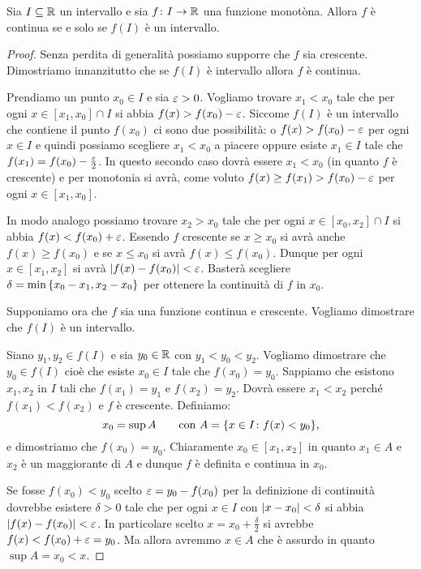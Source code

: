   \begin{theorem}
    \label{th:monotona_continua}%
    \mymark{*}%
    Sia $I\subseteq {\mathbb R}$ un intervallo e sia
    $f\colon I \to {\mathbb R}$ una funzione monotòna.
    Allora $f$ è continua se e solo se $f(I)$ è 
    un intervallo.
  \end{theorem}
  \begin{proof}
  Senza perdita di generalità possiamo supporre che $f$ 
  sia crescente. 
  Dimostriamo innanzitutto che se $f(I)$ è intervallo allora $f$ è continua.
  
  Prendiamo un punto $x_0\in I$ e sia $\varepsilon>0$.
  Vogliamo trovare $x_1<x_0$ tale che  
  per ogni $x\in [x_1,x_0]\cap I$ si abbia $f(x)>f(x_0)-\varepsilon$.
  Siccome $f(I)$ è un intervallo che contiene il punto $f(x_0)$ 
  ci sono due possibilità: o $f(x)>f(x_0)-\varepsilon$ per ogni $x\in I$
  e quindi possiamo scegliere $x_1<x_0$ a piacere
  oppure esiste $x_1\in I$ tale che $f(x_1)=f(x_0) - \frac {\varepsilon} 2$.
  In questo secondo caso dovrà essere $x_1<x_0$ (in quanto $f$ è crescente)
  e per monotonia si avrà, come voluto $f(x)\ge f(x_1) > f(x_0)-\varepsilon$ 
  per ogni $x\in [x_1,x_0]$.
  
  In modo analogo possiamo trovare $x_2>x_0$ tale 
  che per ogni $x\in [x_0,x_2]\cap I$ si abbia $f(x) < f(x_0)+\varepsilon$.
  Essendo $f$ crescente se $x\ge x_0$ si avrà anche $f(x)\ge f(x_0)$ 
  e se $x\le x_0$ si avrà $f(x) \le f(x_0)$. 
  Dunque per ogni $x\in [x_1,x_2]$ si avrà ${\left|f(x)-f(x_0)\right|}<\varepsilon$.
  Basterà scegliere $\delta = \min{\left\{ x_0-x_1,x_2-x_0 \right\}}$ 
  per ottenere la continuità di $f$ in $x_0$.
  
  Supponiamo ora che $f$ sia una funzione continua e crescente.
  Vogliamo dimostrare che $f(I)$ è un intervallo.
  
  Siano $y_1, y_2 \in f(I)$ e sia $y_0\in {\mathbb R}$
  con $y_1 < y_0 < y_2$.
  Vogliamo dimostrare che $y_0\in f(I)$ cioè che esiste $x_0\in I$
  tale che $f(x_0)=y_0$.
  Sappiamo che esistono $x_1,x_2$ in $I$ tali che
  $f(x_1) = y_1$ e $f(x_2) = y_2$.
  Dovrà essere $x_1<x_2$ perché $f(x_1)<f(x_2)$ e
  $f$ è crescente.
  Definiamo:
  \[
   x_0 = \sup A
  \qquad
  \text{con } A={\left\{ x\in I\colon f(x)<y_0 \right\}},
  \]
  e dimostriamo che $f(x_0)=y_0$. 
  Chiaramente $x_0\in [x_1,x_2]$ in quanto 
  $x_1\in A$ e $x_2$ è un maggiorante di $A$
  e dunque $f$ è definita e continua in $x_0$.
  
  Se fosse $f(x_0)<y_0$ scelto $\varepsilon = y_0-f(x_0)$
  per la definizione di continuità dovrebbe esistere
  $\delta>0$ tale che per ogni $x\in I$ con ${\left|x-x_0\right|}<\delta$
  si abbia ${\left|f(x)-f(x_0)\right|}<\varepsilon$.
  In particolare scelto $x=x_0+\frac \delta 2$
  si avrebbe $f(x) < f(x_0) + \varepsilon = y_0$.
  Ma allora avremmo $x\in A$ che è assurdo in quanto
  $\sup A = x_0 < x$.
  

\end{proof}
